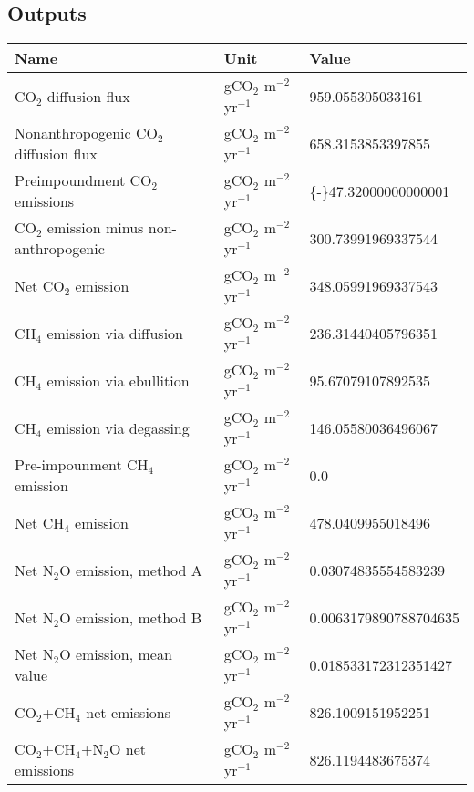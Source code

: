 \documentclass{article}%
\begin{document}
%
\subsection{Outputs}%
\label{subsec:Outputs}%
\begin{center}%
\renewcommand{\arraystretch}{1.0}%
\begin{tabu}{@{}p{10cm} X[c] X[l]@{}}%
\toprule%
\textbf{Name}&\textbf{Unit}&\textbf{Value}\\%
\midrule%
CO$_2$ diffusion flux&gCO$_2$ m$^{-2}$ yr$^{-1}$&\num[round-precision=4,round-mode=figures]{959.055305033161}\\%
Nonanthropogenic CO$_2$ diffusion flux&gCO$_2$ m$^{-2}$ yr$^{-1}$&\num[round-precision=4,round-mode=figures]{658.3153853397855}\\%
Preimpoundment CO$_2$ emissions&gCO$_2$ m$^{-2}$ yr$^{-1}$&\num[round-precision=4,round-mode=figures]{{-}47.32000000000001}\\%
CO$_2$ emission minus non-anthropogenic&gCO$_2$ m$^{-2}$ yr$^{-1}$&\num[round-precision=4,round-mode=figures]{300.73991969337544}\\%
Net CO$_2$ emission&gCO$_2$ m$^{-2}$ yr$^{-1}$&\num[round-precision=4,round-mode=figures]{348.05991969337543}\\%
CH$_4$ emission via diffusion&gCO$_2$ m$^{-2}$ yr$^{-1}$&\num[round-precision=4,round-mode=figures]{236.31440405796351}\\%
CH$_4$ emission via ebullition&gCO$_2$ m$^{-2}$ yr$^{-1}$&\num[round-precision=4,round-mode=figures]{95.67079107892535}\\%
CH$_4$ emission via degassing&gCO$_2$ m$^{-2}$ yr$^{-1}$&\num[round-precision=4,round-mode=figures]{146.05580036496067}\\%
Pre-impounment CH$_4$ emission&gCO$_2$ m$^{-2}$ yr$^{-1}$&\num[round-precision=4,round-mode=figures]{0.0}\\%
Net CH$_4$ emission&gCO$_2$ m$^{-2}$ yr$^{-1}$&\num[round-precision=4,round-mode=figures]{478.0409955018496}\\%
Net N$_2$O emission, method A&gCO$_2$ m$^{-2}$ yr$^{-1}$&\num[round-precision=4,round-mode=figures]{0.03074835554583239}\\%
Net N$_2$O emission, method B&gCO$_2$ m$^{-2}$ yr$^{-1}$&\num[round-precision=4,round-mode=figures]{0.0063179890788704635}\\%
Net N$_2$O emission, mean value&gCO$_2$ m$^{-2}$ yr$^{-1}$&\num[round-precision=4,round-mode=figures]{0.018533172312351427}\\%
\midrule%
CO$_2$+CH$_4$ net emissions&gCO$_2$ m$^{-2}$ yr$^{-1}$&\num[round-precision=4,round-mode=figures]{826.1009151952251}\\%
\midrule%
CO$_2$+CH$_4$+N$_2$O net emissions&gCO$_2$ m$^{-2}$ yr$^{-1}$&\num[round-precision=4,round-mode=figures]{826.1194483675374}\\\bottomrule%
%
\end{tabu}%
\end{center}%
\end{document}
